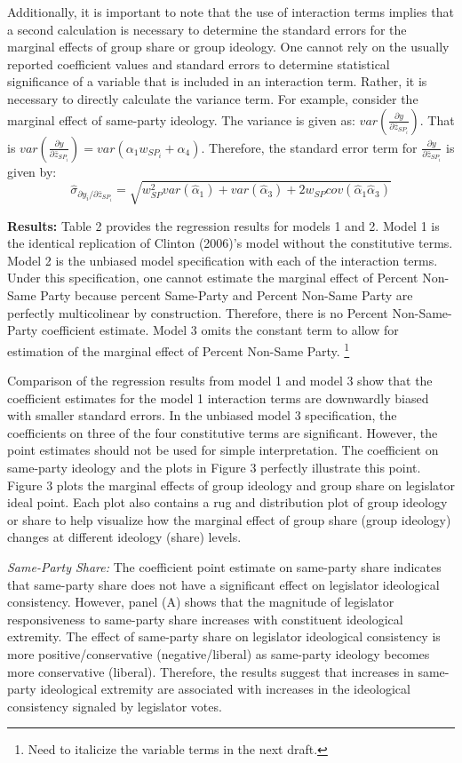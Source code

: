 \documentclass[10pt,letterpaper]{article}
\begin{document}
Additionally, it is important to note that the use of interaction terms implies that a second calculation is necessary to determine the standard errors for the marginal effects of group share or group ideology. One cannot rely on the usually reported coefficient values and standard errors to determine statistical significance of a variable that is included in an interaction term. Rather, it is necessary to directly calculate the variance term. For example, consider the marginal effect of same-party ideology. The variance is given as:  $var(\frac{\partial y}{\partial \bar{z}_{SP_i}})$. That is $var(\frac{\partial y}{\partial \bar{z}_{SP_i}}) = var(\alpha_1 w_{SP_i} + \alpha_4)$. Therefore, the standard error term for $\frac{\partial y}{\partial \bar{z}_{SP_i}}$ is given by:
$$\hat{\sigma}_{\partial y_i / \partial \bar{z}_{SP_i}} = \sqrt{w_{SP}^2var(\hat{\alpha}_1)+var(\hat{\alpha}_3)+2w_{SP}cov(\hat{\alpha}_1\hat{\alpha}_3)}$$

\textbf{Results:} Table 2 provides the regression results for models 1 and 2. Model 1 is the identical replication of Clinton (2006)'s model without the constitutive terms. Model 2 is the unbiased model specification with each of the interaction terms. Under this specification, one cannot estimate the marginal effect of Percent Non-Same Party because percent Same-Party and Percent Non-Same Party are perfectly multicolinear by construction. Therefore, there is no Percent Non-Same-Party coefficient estimate.  Model 3 omits the constant term to allow for estimation of the marginal effect of Percent Non-Same Party. \footnote{Need to italicize the variable terms in the next draft.}

Comparison of the regression results from model 1 and model 3 show that the coefficient estimates for the model 1 interaction terms are downwardly biased with smaller standard errors. In the unbiased model 3 specification, the coefficients on three of the four constitutive terms are significant. However, the point estimates should not be used for simple interpretation. The coefficient on same-party ideology and the plots in Figure 3 perfectly illustrate this point.  Figure 3 plots the marginal effects of group ideology and group share on legislator ideal point. Each plot also contains a rug and distribution plot of group ideology or share to help visualize how  the marginal effect of group share (group ideology) changes at different ideology (share) levels.

\textit{Same-Party Share:} The coefficient point estimate on same-party share indicates that same-party share  does not have a significant effect on legislator ideological consistency. However, panel (A) shows that the magnitude of legislator responsiveness to same-party share increases with constituent ideological extremity. The effect of same-party share on legislator ideological consistency is more positive/conservative (negative/liberal) as same-party ideology becomes more conservative (liberal). Therefore, the results suggest that increases in same-party ideological extremity are associated with increases in the ideological consistency signaled by legislator votes. 
\end{document}
